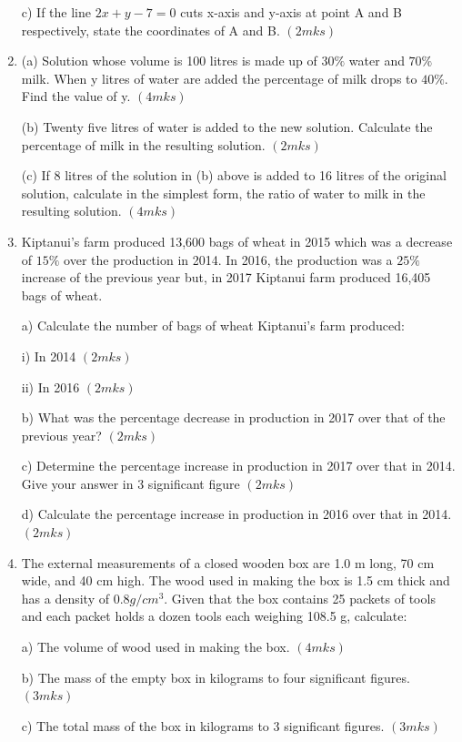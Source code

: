 \documentclass[
  a4paperpaper,
]{scrbook}
\begin{document}
\begin{tcolorbox}
\begin{enumerate}
  c) If the line \(2x+y-7=0\) cuts x-axis and y-axis at point A and B
  respectively, state the coordinates of A and B. \((2mks)\)
\item
  (a) Solution whose volume is 100 litres is made up of \(30\%\) water
  and \(70\%\) milk. When y litres of water are added the percentage of
  milk drops to \(40\%\). Find the value of y. \((4mks)\)

  (b) Twenty five litres of water is added to the new solution.
  Calculate the percentage of milk in the resulting solution. \((2mks)\)

  (c) If 8 litres of the solution in (b) above is added to 16 litres of
  the original solution, calculate in the simplest form, the ratio of
  water to milk in the resulting solution. \((4mks)\)
\item
  Kiptanui's farm produced 13,600 bags of wheat in 2015 which was a
  decrease of \(15\%\) over the production in 2014. In 2016, the
  production was a \(25\%\) increase of the previous year but, in 2017
  Kiptanui farm produced 16,405 bags of wheat.

  a) Calculate the number of bags of wheat Kiptanui's farm produced:

  i) In 2014 \((2mks)\)

  ii) In 2016 \((2mks)\)

  b) What was the percentage decrease in production in 2017 over that of
  the previous year? \((2mks)\)

  c) Determine the percentage increase in production in 2017 over that
  in 2014. Give your answer in 3 significant figure \((2mks)\)

  d) Calculate the percentage increase in production in 2016 over that
  in 2014. \((2mks)\)
\item
  The external measurements of a closed wooden box are 1.0 m long, 70 cm
  wide, and 40 cm high. The wood used in making the box is 1.5 cm thick
  and has a density of \(0.8 g/cm^3\). Given that the box contains 25
  packets of tools and each packet holds a dozen tools each weighing
  108.5 g, calculate:

  a) The volume of wood used in making the box. \((4mks)\)

  b) The mass of the empty box in kilograms to four significant figures.
  \((3mks)\)

  c) The total mass of the box in kilograms to 3 significant figures.
  \((3mks)\)
\end{enumerate}

\end{tcolorbox}
\end{document}
